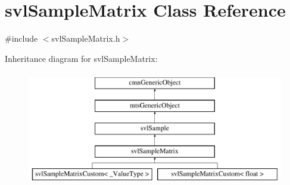 \hypertarget{classsvl_sample_matrix}{}\section{svl\+Sample\+Matrix Class Reference}
\label{classsvl_sample_matrix}


{\ttfamily \#include $<$svl\+Sample\+Matrix.\+h$>$}

Inheritance diagram for svl\+Sample\+Matrix\+:\begin{figure}[H]
\begin{center}
\leavevmode
\includegraphics[height=5.000000cm]{d1/dd4/classsvl_sample_matrix}
\end{center}
\end{figure}

